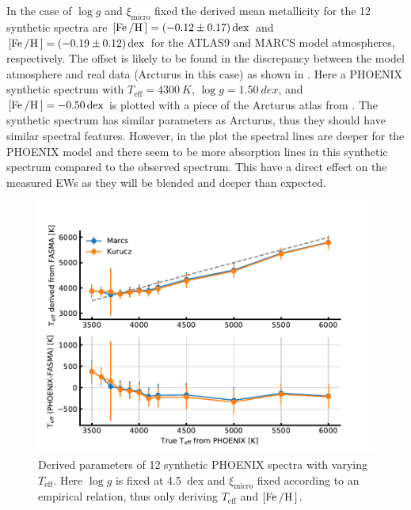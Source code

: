 In the case of $\log g$ and $\xi_\mathrm{micro}$ fixed the derived mean metallicity for the 12
synthetic spectra are $[\ion{Fe}/\ion{H}]=\SI{-0.12(17)}{dex}$ and
$[\ion{Fe}/\ion{H}]=\SI{-0.19(12)}{dex}$ for the ATLAS9 and MARCS model atmospheres, respectively.
The offset is likely to be found in the discrepancy between the model atmosphere and real data
(Arcturus in this case) as shown in . Here a PHOENIX synthetic spectrum
with $T_\mathrm{eff}=\SI{4300}{K}$, $\log g=\SI{1.50}{dex}$, and
$[\ion{Fe}/\ion{H}]=\SI{-0.50}{dex}$ is plotted with a piece of the Arcturus atlas from
. The synthetic spectrum has similar parameters as Arcturus, thus they should
have similar spectral features. However, in the plot the spectral lines are deeper for the PHOENIX
model and there seem to be more absorption lines in this synthetic spectrum compared to the observed
spectrum. This have a direct effect on the measured EWs as they will be blended and deeper than
expected. 


\begin{figure}[htpb!]
    \centering
    \includegraphics[width=1.0\linewidth]{figures/simulated_teff_fix.pdf}
    \caption{Derived parameters of 12 synthetic PHOENIX spectra with varying $T_\mathrm{eff}$. Here
             $\log g$ is fixed at \SI{4.5}{dex} and $\xi_\mathrm{micro}$ fixed according to an
             empirical relation, thus only deriving $T_\mathrm{eff}$ and $[\ion{Fe}/\ion{H}]$.}
    \label{fig:phoenix_fix}
\end{figure}

